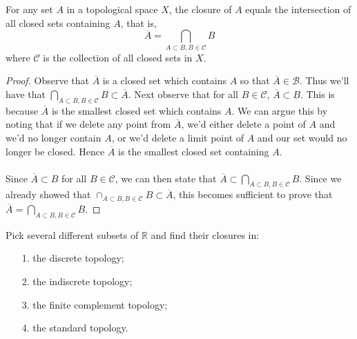 \documentclass[letterpaper,12pt,twoside]{maths}
\begin{document}
\begin{problem}[Theorem 3.20] For any set $A$ in a topological space
    $X$, the closure of $A$ equals the intersection of all closed sets
    containing $A$, that is,
    $$
    \overline{A} = \bigcap\limits_{A \subset B, B \in \mathscr{C}} B
    $$
    where $\mathscr{C}$ is the collection of all closed sets in $X$.
\end{problem}

\begin{proof}
    Observe that $\overline{A}$ is a closed set which contains $A$ so
    that 
    $\overline{A} \in \mathscr{B}$. Thus we'll have that
    $\bigcap\limits_{A
    \subset B, B \in \mathscr{C}} B \subset \overline{A}$. Next
    observe that for all $B \in \mathscr{C}$, $\overline{A} \subset
    B$. This is because $\overline{A}$ 
    is the smallest closed set which contains $A$.
    We can argue this by noting that if we delete any
    point from $\overline{A}$, we'd either delete a point of $A$
    and we'd no longer contain $A$, or we'd delete a limit point of
    $A$ and our set would no longer be closed. Hence $\overline{A}$ is
    the smallest closed set containing $A$.\\
    \\
    Since $\overline{A} \subset B$ for all $B \in \mathscr{C}$, we can
    then state that $\overline{A} \subset \bigcap\limits_{A \subset B, B \in
    \mathscr{C}} B$. Since we already showed that $\cap_{A \subset B,
    B \in \mathscr{C}} B \subset \overline{A}$, this becomes
    sufficient to prove that $\overline{A} = \bigcap\limits_{A \subset B, B \in
    \mathscr{C}} B$.

\end{proof}

\begin{exercise}[Exercise 3.21]
    Pick several different subsets of $\mathbb{R}$
and find their closures in:
\begin{itemize}
    \item[1.] the discrete topology;
    \item[2.] the indiscrete topology;
    \item[3.] the finite complement topology; 
    \item[4.] the standard topology. 
\end{itemize}
\end{exercise}
\end{document}
